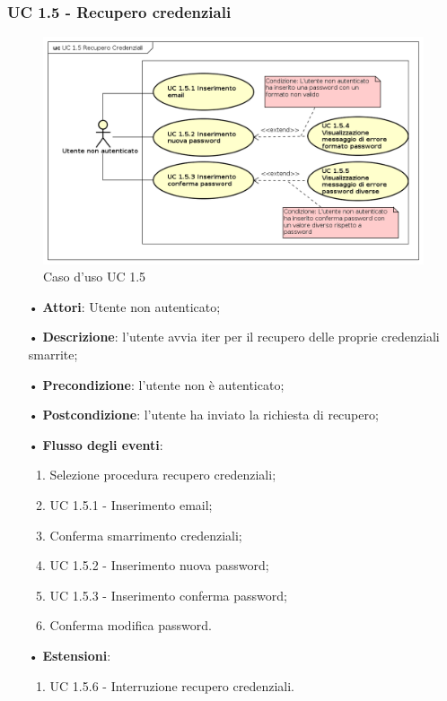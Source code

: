\subsubsection{UC 1.5 - Recupero credenziali}
\begin{figure}[H]
	\centering
	\includegraphics[width=14cm, keepaspectratio]{img/UC15.png} 
	\caption{Caso d'uso UC 1.5}\label{fig:15}
\end{figure}
\begin{itemize}
	\item[•]\textbf{Attori}: Utente non autenticato;
	\item[•]\textbf{Descrizione}: l’utente avvia iter per il recupero delle proprie credenziali smarrite;
	\item[•]\textbf{Precondizione}: l’utente non è autenticato;
	\item[•]\textbf{Postcondizione}: l’utente ha inviato la richiesta di recupero;
	\item[•]\textbf{Flusso degli eventi}:
	\begin{enumerate}
	\item Selezione procedura recupero credenziali;
	\item UC 1.5.1 - Inserimento email;
	\item Conferma smarrimento credenziali;
	\item UC 1.5.2 - Inserimento nuova password;
	\item UC 1.5.3 - Inserimento conferma password;
	\item Conferma modifica password.
	\end{enumerate}
	\item[•]\textbf{Estensioni}:
	\begin{enumerate}
		\item UC 1.5.6 - Interruzione recupero credenziali.
	\end{enumerate}
\end{itemize}

